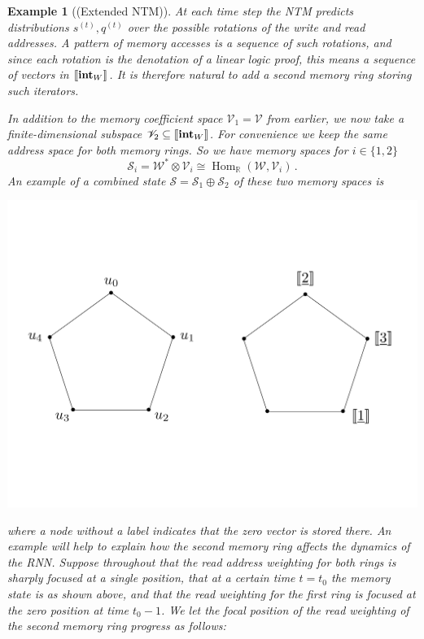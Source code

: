 \documentclass[english,letter paper,12pt,leqno]{article}
\theoremstyle{example}
\newtheorem{example}[theorem]{Example}
\numberwithin{equation}{section}
\def\Hom{\operatorname{Hom}}
\begin{document}
\begin{example}[(Extended NTM)] At each time step the NTM predicts distributions $s^{(t)}, q^{(t)}$ over the possible rotations of the write and read addresses. A pattern of memory accesses is a \emph{sequence} of such rotations, and since each rotation is the denotation of a linear logic proof, this means a sequence of vectors in $\llbracket \textbf{int}_W \rrbracket$. It is therefore natural to add a second memory ring storing such iterators.

In addition to the memory coefficient space $\mathscr{V}_1 = \mathscr{V}$ from earlier, we now take a finite-dimensional subspace $\mathscr{V}_2 \subseteq \llbracket \textbf{int}_W \rrbracket$. For convenience we keep the same address space for both memory rings. So we have memory spaces for $i \in \{1,2\}$
\[
\mathscr{S}_i = \mathscr{W}^* \otimes \mathscr{V}_i \cong \Hom_{\mathbb{R}}(\mathscr{W}, \mathscr{V}_i)\,.
\]
An example of a combined state $\mathscr{S} = \mathscr{S}_1 \oplus \mathscr{S}_2$ of these two memory spaces is
\begin{center}
\includegraphics[scale=0.3]{dia2}
\end{center}
where a node without a label indicates that the zero vector is stored there. An example will help to explain how the second memory ring affects the dynamics of the RNN. Suppose throughout that the read address weighting for both rings is sharply focused at a single position, that at a certain time $t = t_0$ the memory state is as shown above, and that the read weighting for the first ring is focused at the zero position at time $t_0 - 1$. We let the focal position of the read weighting of the second memory ring progress as follows:

\end{example}
\end{document}
